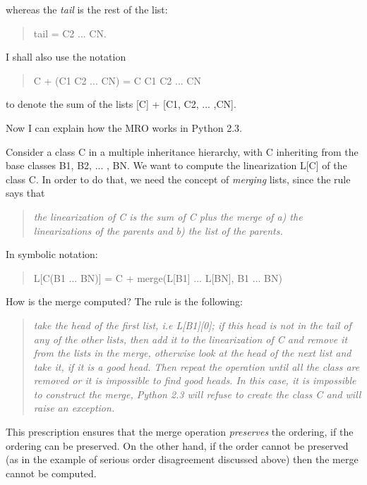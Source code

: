 \documentclass[10pt,english]{article}
\begin{document}
whereas the \emph{tail} is the rest of the list:
\begin{quote}

tail = C2 ... CN.
\end{quote}

I shall also use the notation
\begin{quote}

C + (C1 C2 ... CN) = C C1 C2 ... CN
\end{quote}

to denote the sum of the lists [C] + [C1, C2, ... ,CN].

Now I can explain how the MRO works in Python 2.3.

Consider a class C in a multiple inheritance hierarchy, with C
inheriting from the base classes B1, B2, ...  , BN.  We want to compute
the linearization L[C] of the class C. In order to do that, we need the
concept of \emph{merging} lists, since the rule says that
\begin{quote}

\emph{the linearization of C is the sum of C plus the merge of a) the
linearizations of the parents and b) the list of the parents.}
\end{quote}

In symbolic notation:
\begin{quote}

L[C(B1 ... BN)] = C + merge(L[B1] ... L[BN], B1 ... BN)
\end{quote}

How is the merge computed? The rule is the following:
\begin{quote}

\emph{take the head of the first list, i.e L[B1][0]; if this head is not in
the tail of any of the other lists, then add it to the linearization
of C and remove it from the lists in the merge, otherwise look at the
head of the next list and take it, if it is a good head.  Then repeat
the operation until all the class are removed or it is impossible to
find good heads.  In this case, it is impossible to construct the
merge, Python 2.3 will refuse to create the class C and will raise an
exception.}
\end{quote}

This prescription ensures that the merge operation \emph{preserves} the
ordering, if the ordering can be preserved.  On the other hand, if the
order cannot be preserved (as in the example of serious order
disagreement discussed above) then the merge cannot be computed.
\end{document}

